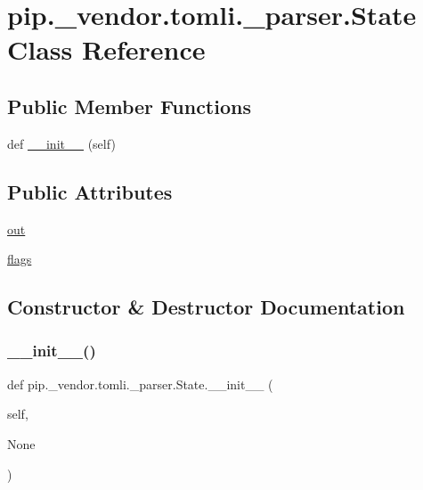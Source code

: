 \hypertarget{classpip_1_1__vendor_1_1tomli_1_1__parser_1_1State}{}\section{pip.\+\_\+vendor.\+tomli.\+\_\+parser.\+State Class Reference}
\label{classpip_1_1__vendor_1_1tomli_1_1__parser_1_1State}
\subsection*{Public Member Functions}
\begin{DoxyCompactItemize}
\item 
def \hyperlink{classpip_1_1__vendor_1_1tomli_1_1__parser_1_1State_a8ba4b2dcfed39df4e6c4ed76b82eedff}{\+\_\+\+\_\+init\+\_\+\+\_\+} (self)
\end{DoxyCompactItemize}
\subsection*{Public Attributes}
\begin{DoxyCompactItemize}
\item 
\hyperlink{classpip_1_1__vendor_1_1tomli_1_1__parser_1_1State_ac672fc6ddae092851529e02c9aeb52bd}{out}
\item 
\hyperlink{classpip_1_1__vendor_1_1tomli_1_1__parser_1_1State_a40c73e511ad1eb8bc942b9f576ac94cb}{flags}
\end{DoxyCompactItemize}


\subsection{Constructor \& Destructor Documentation}
\mbox{\label{classpip_1_1__vendor_1_1tomli_1_1__parser_1_1State_a8ba4b2dcfed39df4e6c4ed76b82eedff}} 
\subsubsection{\texorpdfstring{\+\_\+\+\_\+init\+\_\+\+\_\+()}{\_\_init\_\_()}}
{\footnotesize\ttfamily def pip.\+\_\+vendor.\+tomli.\+\_\+parser.\+State.\+\_\+\+\_\+init\+\_\+\+\_\+ (\begin{DoxyParamCaption}\item[{}]{self,  }\item[{}]{None }\end{DoxyParamCaption})}



